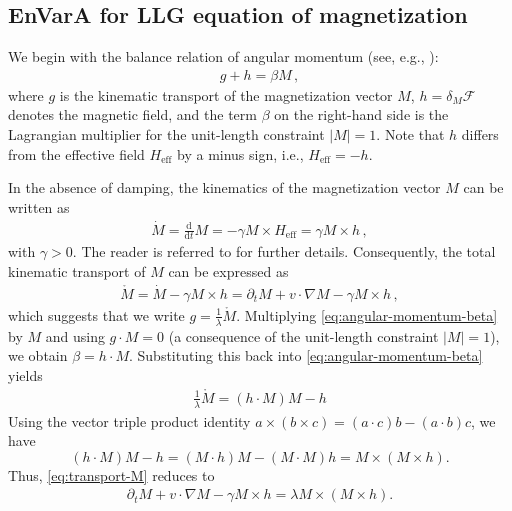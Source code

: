 \documentclass[reqno,11pt]{amsart}
\numberwithin{equation}{section}
\def\p{\partial}
\def\d{\mathrm{d}}
\def\eff{\mathrm{eff}}
\begin{document}
\subsection{EnVarA for LLG equation of magnetization}\label{sec:envara_for_LLG}

We begin with the balance relation of angular momentum (see, e.g., \cite{DALS18,WXL-13arma}): 
\begin{align}\label{eq:angular-momentum-beta}
  g + h = \beta M \,, 
\end{align}
where $g$ is the kinematic transport of the magnetization vector $M$, $h = \delta_M \mathcal{F} $ denotes the magnetic field, and the term $\beta$ on the right-hand side is the Lagrangian multiplier for the unit-length constraint $|M|=1$. Note that \(h\) differs from the effective field \(H_{\text{eff}}\) by a minus sign, i.e., \(H_{\text{eff}} = -h\). 

In the absence of damping, the kinematics of the magnetization vector \(M\) can be written as
\begin{align}
\dot M = \frac{\d }{\d t} M = -\gamma M \times H_{\eff} = \gamma M \times h \,, 
\end{align}
with $\gamma >0$. The reader is referred to \cite{Gilbert-04ieee} for further details.  Consequently, the total kinematic transport of \(M\) can be expressed as
\begin{align}\label{eq:transport-M0}
\mathring{M} = \dot M - \gamma M \times h = \p_t M + v \cdot \nabla M - \gamma M \times h \,, 
\end{align}
which suggests that we write $g = \tfrac{1}{\lambda} \mathring{M} $. Multiplying \eqref{eq:angular-momentum-beta} by \(M\) and using \(g \cdot M = 0\) (a consequence of the unit-length constraint \(|M|=1\)), we obtain \(\beta = h \cdot M\).  Substituting this back into \eqref{eq:angular-momentum-beta} yields
\begin{align}\label{eq:transport-M}
\frac{1}{\lambda} \mathring{M} = (h \cdot M) M - h 
\end{align}
Using the vector triple product identity \(a \times (b \times c) = (a \cdot c) b - (a \cdot b) c\), we have 
$$(h \cdot M) M - h = (M \cdot h) M - (M \cdot M)h = M \times (M \times h).$$ 
Thus, \eqref{eq:transport-M} reduces to
\begin{align}\label{eq:angular-momentum-h}
\p_t M + v \cdot \nabla M - \gamma M \times h = \lambda M \times (M \times h).
\end{align}
\end{document}
